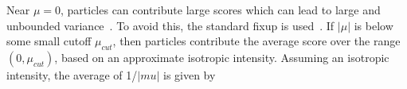 Near $\mu=0$, particles can contribute large scores which can lead to large and
unbounded variance~\cite{favorite_faces}.  To avoid this, the standard fixup 
is used~\cite{mcnp,favorite_faces}.  If $|\mu|$ is below some small cutoff $\mu_{cut}$, then 
particles contribute the average score over the range $(0,\mu_{cut})$, based on an
approximate isotropic intensity.  Assuming an isotropic intensity, the average of
1/$|mu|$ is given by
\begin{equation}
\end{equation}

